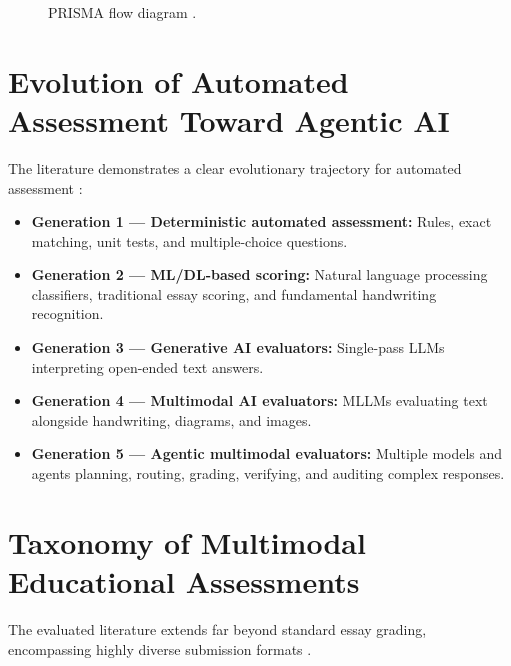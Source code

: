 \documentclass[11pt,a4paper]{article}
\begin{document}
\begin{figure}[H]
\centering
{}
\caption{PRISMA flow diagram \cite{P013}.}
\label{fig:prisma}
\end{figure}

\section{Evolution of Automated Assessment Toward Agentic AI}
The literature demonstrates a clear evolutionary trajectory for automated assessment \cite{P002, P007, P013, P020, P021}:
\begin{itemize}
    \item \textbf{Generation 1 — Deterministic automated assessment:} Rules, exact matching, unit tests, and multiple-choice questions.
    \item \textbf{Generation 2 — ML/DL-based scoring:} Natural language processing classifiers, traditional essay scoring, and fundamental handwriting recognition.
    \item \textbf{Generation 3 — Generative AI evaluators:} Single-pass LLMs interpreting open-ended text answers.
    \item \textbf{Generation 4 — Multimodal AI evaluators:} MLLMs evaluating text alongside handwriting, diagrams, and images.
    \item \textbf{Generation 5 — Agentic multimodal evaluators:} Multiple models and agents planning, routing, grading, verifying, and auditing complex responses.
\end{itemize}

\section{Taxonomy of Multimodal Educational Assessments}
The evaluated literature extends far beyond standard essay grading, encompassing highly diverse submission formats \cite{P004, P015, P020}. 
\end{document}
